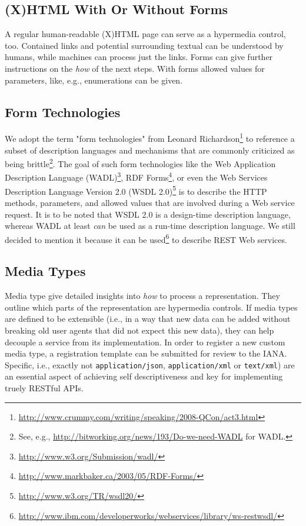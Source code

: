 \documentclass{acm_proc_article-sp}
\begin{document}
\subsection{(X)HTML With Or Without Forms}\label{sec:xhtml}
A regular human-readable (X)HTML page can serve as a hypermedia control, too. Contained links and potential surrounding textual can be understood by humans, while machines can process just the links. Forms can give further instructions on the \textit{how} of the next steps. With forms allowed values for parameters, like, e.g., enumerations can be given.

\subsection{Form Technologies}\label{sec:formtechs}
We adopt the term "form technologies" from Leonard Richardson\footnote{\url{http://www.crummy.com/writing/speaking/2008-QCon/act3.html}} to reference a subset of description languages and mechanisms that are commonly criticized as being brittle\footnote{See, e.g., \url{http://bitworking.org/news/193/Do-we-need-WADL} for WADL.}. The goal of such form technologies like the Web Application Description Language (WADL)\footnote{\url{http://www.w3.org/Submission/wadl/}}, RDF Forms\footnote{\url{http://www.markbaker.ca/2003/05/RDF-Forms/}}, or even the Web Services Description Language Version 2.0 (WSDL 2.0)\footnote{\url{http://www.w3.org/TR/wsdl20/}} is to describe the HTTP methods, parameters, and allowed values that are involved during a Web service request. It is to be noted that WSDL 2.0 is a design-time description language, whereas WADL at least \textit{can} be used as a run-time description language. We still decided to mention it because it can be used\footnote{\url{http://www.ibm.com/developerworks/webservices/library/ws-restwsdl/}} to describe REST Web services.

\subsection{Media Types}\label{sec:mediatypes}
Media type give detailed insights into \textit{how} to process a representation. They outline which parts of the representation are hypermedia controls. If media types are defined to be extensible (i.e., in a way that new data can be added without breaking old user agents that did not expect this new data), they can help decouple a service from its implementation. In order to register a new custom media type, a registration template can be submitted for review to the IANA\cite{IANA:Mime}. Specific, i.e., exactly not \texttt{application/json}, \texttt{application/xml} or \texttt{text/xml}) are an essential aspect of achieving self descriptiveness and key for implementing truely RESTful APIs.
\end{document}
